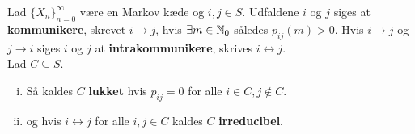 \begin{defn}
Lad $\{X_n\}_{n = 0}^\infty$ være en Markov kæde og $i, j \in S$. Udfaldene $i$ og $j$ siges at \textbf{kommunikere}, skrevet $i \to j$, hvis $\exists m \in \mathbb{N}_0$ således $p_{ij}(m) > 0$. Hvis $i \to j$ og $j \to i$ siges $i$ og $j$ at \textbf{intrakommunikere}, skrives $i \leftrightarrow j$.\\ Lad $C \subseteq S$.
\begin{enumerate}[i)]
    \item Så kaldes $C$ \textbf{lukket} hvis $p_{ij} = 0$ for alle $i \in C, j \not \in C$. 
    \item og hvis  $i \leftrightarrow j$ for alle $i, j \in C$ kaldes $C$ \textbf{irreducibel}.
\end{enumerate}
\end{defn}

